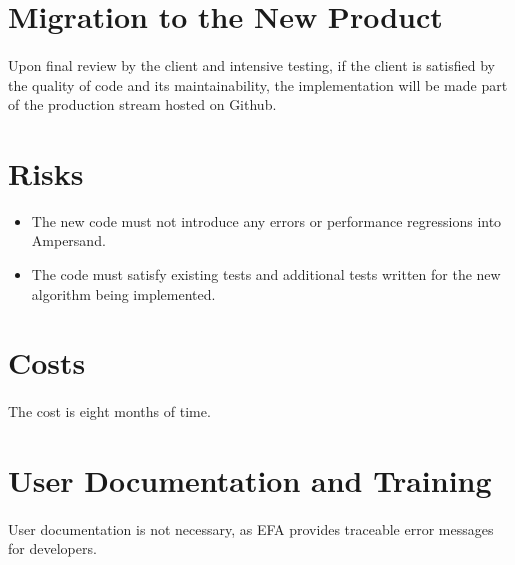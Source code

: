 \documentclass[12pt]{report}
\begin{document}
\section{Migration to the New Product}\label{sec:Migration}
\paragraph*{}
Upon final review by the client and intensive testing, if the client is
satisfied by the quality of code and its maintainability, the implementation
will be made part of the production stream hosted on Github.  
\section{Risks}\label{sec:Risks}
\begin{itemize}
\item The new code must not introduce any errors or performance regressions
into Ampersand.
\item The code must satisfy existing tests and additional tests written for the 
new algorithm being implemented.
\end{itemize}

\section{Costs}\label{sec:Costs}
\paragraph*{}
The cost is eight months of time.

\section{User Documentation and Training}\label{sec:UserDoc}
\paragraph*{}
User documentation is not necessary, as EFA provides traceable error messages 
for developers. 




\end{document}
